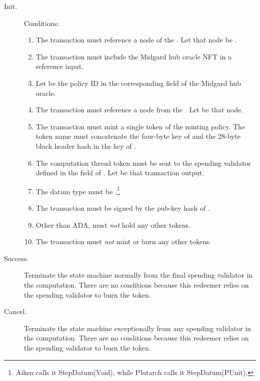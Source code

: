 \documentclass[../midgard.tex]{subfiles}
\begin{document}
\begin{description}
    \item[Init.] Conditions:
        \begin{enumerate}
            \item The transaction must reference a node of the . Let that node be .
            \item The transaction must include the Midgard hub oracle NFT in a reference input.
            \item Let  be the policy ID in the corresponding field of the Midgard hub oracle.
            \item The transaction must reference a node from the . Let  be that node.
            \item The transaction must mint a single token of the  minting policy. The token name must concatenate the four-byte key of  and the 28-byte block header hash in the key of .
            \item The computation thread token must be sent to the spending validator defined in the  field of . Let  be that transaction output.
            \item The  datum type must be .\footnote{Aiken calls it StepDatum(Void), while Plutarch calls it StepDatum(PUnit).} 
            \item The transaction must be signed by the  pub-key hash of .
            \item Other than ADA,  must \emph{not} hold any other tokens.
            \item The transaction must \emph{not} mint or burn any other tokens.
        \end{enumerate}
    \item[Success.] Terminate the state machine normally from the final spending validator in the computation. There are no conditions because this redeemer relies on the spending validator to burn the token.
    \item[Cancel.] Terminate the state machine exceptionally from any spending validator in the computation. There are no conditions because this redeemer relies on the spending validator to burn the token.
\end{description}
\end{document}
